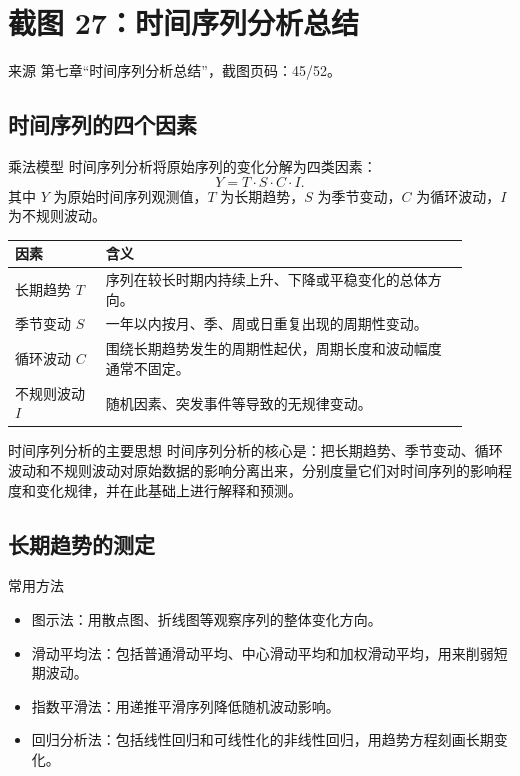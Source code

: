 \documentclass[UTF8,zihao=-4,fontset=fandol]{ctexart}
\begin{document}
\section{截图 27：时间序列分析总结}

\begin{sourcebox}{来源}
第七章“时间序列分析总结”，截图页码：45/52。
\end{sourcebox}

\subsection{时间序列的四个因素}

\begin{keybox}{乘法模型}
时间序列分析将原始序列的变化分解为四类因素：
\[
Y=T\cdot S\cdot C\cdot I.
\]
其中 $Y$ 为原始时间序列观测值，$T$ 为长期趋势，$S$ 为季节变动，$C$ 为循环波动，$I$ 为不规则波动。
\end{keybox}

\begin{longtable}{@{}p{0.18\linewidth}p{0.72\linewidth}@{}}
\toprule
\textbf{因素} & \textbf{含义} \\
\midrule
长期趋势 $T$ & 序列在较长时期内持续上升、下降或平稳变化的总体方向。 \\
季节变动 $S$ & 一年以内按月、季、周或日重复出现的周期性变动。 \\
循环波动 $C$ & 围绕长期趋势发生的周期性起伏，周期长度和波动幅度通常不固定。 \\
不规则波动 $I$ & 随机因素、突发事件等导致的无规律变动。 \\
\bottomrule
\end{longtable}

\begin{methodbox}{时间序列分析的主要思想}
时间序列分析的核心是：把长期趋势、季节变动、循环波动和不规则波动对原始数据的影响分离出来，分别度量它们对时间序列的影响程度和变化规律，并在此基础上进行解释和预测。
\end{methodbox}

\subsection{长期趋势的测定}

\begin{keybox}{常用方法}
\begin{itemize}
  \item 图示法：用散点图、折线图等观察序列的整体变化方向。
  \item 滑动平均法：包括普通滑动平均、中心滑动平均和加权滑动平均，用来削弱短期波动。
  \item 指数平滑法：用递推平滑序列降低随机波动影响。
  \item 回归分析法：包括线性回归和可线性化的非线性回归，用趋势方程刻画长期变化。
\end{itemize}
\end{keybox}
\end{document}
